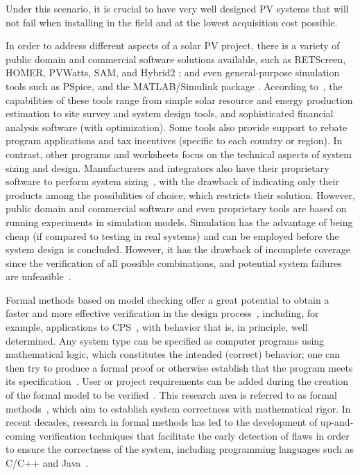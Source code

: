 Under this scenario, it is crucial to have very well designed PV systems that will not fail when installing in the field and at the lowest acquisition cost possible.

In order to address different aspects of a solar PV project, there is a variety of public domain and commercial software solutions available, such as RETScreen, HOMER, PVWatts, SAM, and Hybrid2 \cite{Pradhan,Swarnkar,NRELDobos,NRELBlair,Mills}; and even general-purpose simulation tools such as PSpice, and the MATLAB/Simulink package \cite{Gow1999,Benatiallah2017}. According to~\cite{Brooks}, the capabilities of these tools range from simple solar resource and energy production estimation to site survey and system design tools, and sophisticated financial analysis software (with optimization). Some tools also provide support to rebate program applications and tax incentives (specific to each country or region). In contrast, other programs and worksheets focus on the technical aspects of system sizing and design.  
%
Manufacturers and integrators also have their proprietary software to perform system sizing~\cite{Zhou2010}, with the drawback of indicating only their products among the possibilities of choice, which restricts their solution. 
%
However, public domain and commercial software and even proprietary tools are based on running experiments in simulation models. Simulation has the advantage of being cheap (if compared to testing in real systems) and can be employed before the system design is concluded. However, it has the drawback of incomplete coverage since the verification of all possible combinations, and potential system failures are unfeasible~\cite{ClarkeHV18}.

Formal methods based on model checking offer a great potential to obtain a faster and more effective verification in the design process~\cite{ClarkeHV18}, including, for example, applications to CPS~\cite{Abateetal2017,AbateBCCDKK17,Bessa,ChavesBCKF17,AbateBCCCDKKP17}, with behavior that is, in principle, well determined. 
Any system type can be specified as computer programs using mathematical logic, which constitutes the intended (correct) behavior; one can then try to produce a formal proof or otherwise establish that the program meets its specification~\cite{DBLP:journals/sttt/GadelhaIC17}. User or project requirements can be added during the creation of the formal model to be verified~\cite{Trindade,TrindadeDJISC17}. 
%
This research area is referred to as formal methods~\cite{Clarkeetal}, which aim to establish system correctness with mathematical rigor. 
In recent decades, research in formal methods has led to the development of up-and-coming verification techniques that facilitate the early detection of flaws in order to ensure the correctness of the system, including programming languages such as C/C++ and Java~\cite{esbmc2018,RamalhoFSMC013,CordeiroKKST18}. 

